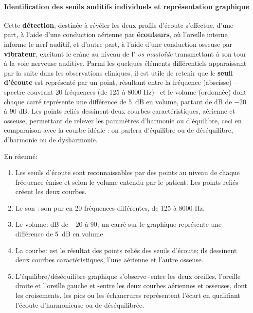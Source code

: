 \paragraph{Identification des seuils auditifs individuels et représentation graphique}

Cette \textbf{détection}, destinée à révéler les deux profils d'écoute
s'effectue, d'une part, à l'aide d'une
conduction aérienne par \textbf{écouteurs}, où l'oreille interne
informe le nerf auditif,  et d'autre part, à l'aide
d'une conduction osseuse par\textbf{ vibrateur}, excitant le crâne au
niveau de l'
\textit{os mastoïde} transmettant à son tour à  la voie nerveuse
auditive.
Parmi les quelques éléments différentiels
apparaissant par la suite dans les observations cliniques, il est utile de retenir
que le \textbf{seuil d'écoute} est représenté par un point, résultant entre la
fréquence (abscisse) --spectre couvrant 20
fréquences (de 125 à 8000 Hz)--   et le volume
(ordonnée) dont chaque carré représente une différence de \SI{5}{\dB} en
volume, partant de dB de $-20$ à 90 dB.
Les points reliés dessinent deux courbes caractéristiques, aérienne
et osseuse, permettant de relever les paramètres d'harmonie ou
          d'équilibre, ceci
 	en comparaison avec la courbe idéale : on parlera
        d'équilibre ou de
 	déséquilibre, d'harmonie ou de dysharmonie. 	
 	
En résumé: 
        \begin{enumerate}

  \item   Les seuils d'écoute sont reconnaissables par des points au niveau de
          chaque fréquence émise et selon le volume entendu par le
          patient. Les points reliés créent les deux courbes.
 	\item Le son : son pur en 20 fréquences différentes, de 125 à 8000 Hz.
 	\item Le volume: dB de $-20$ à 90; un carré sur le graphique représente une différence de \SI{5}{\dB} en
 		volume
 	\item La courbe: est le résultat des points reliés des seuils
          d'écoute; ils
          dessinent deux courbes caractéristiques, l'une aérienne et l'autre osseuse.
\item L'équilibre/déséquilibre graphique s'observe
        -entre les deux oreilles, l'oreille droite et l'oreille gauche
        et
        -entre les deux courbes aériennes et osseuses, dont les
        croisements, les pics ou les échancrures représentent
        l'écart en
        qualifiant l'écoute d'harmonieuse ou de
        déséquilibrée.
      \end{enumerate}


